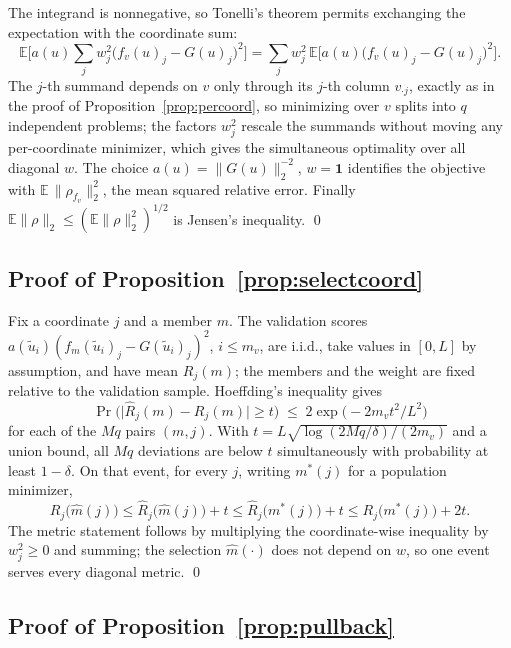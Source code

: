 The integrand is nonnegative, so Tonelli's theorem permits exchanging the
expectation with the coordinate sum:
\[
\mathbb E\Big[a(u)\sum_j w_j^2\big(f_v(u)_j-G(u)_j\big)^2\Big]
=\sum_j w_j^2\,\mathbb E\Big[a(u)\big(f_v(u)_j-G(u)_j\big)^2\Big].
\]
The $j$-th summand depends on $v$ only through its $j$-th column
$v_{\cdot j}$, exactly as in the proof of
Proposition~\ref{prop:percoord}, so minimizing over $v$ splits into $q$
independent problems; the factors $w_j^2$ rescale the summands without
moving any per-coordinate minimizer, which gives the simultaneous optimality
over all diagonal $w$. The choice $a(u)=\|G(u)\|_2^{-2}$, $w=\mathbf 1$
identifies the objective with $\mathbb E\,\|\rho_{f_v}\|_2^2$, the mean
squared relative error. Finally
$\mathbb E\|\rho\|_2\le(\mathbb E\|\rho\|_2^2)^{1/2}$ is Jensen's
inequality. \qed

\subsection{Proof of Proposition~\ref{prop:selectcoord}}
\label{proof:prop:selectcoord}

Fix a coordinate $j$ and a member $m$. The validation scores
$a(\tilde u_i)(f_m(\tilde u_i)_j-G(\tilde u_i)_j)^2$, $i\le m_v$, are i.i.d.,
take values in $[0,L]$ by assumption, and have mean $R_j(m)$; the members and
the weight are fixed relative to the validation sample. Hoeffding's
inequality gives
\[
\Pr\Big(\big|\widehat R_j(m)-R_j(m)\big|\ge t\Big)\;\le\;
2\exp\!\big(-2m_v t^2/L^2\big)
\]
for each of the $Mq$ pairs $(m,j)$. With
$t=L\sqrt{\log(2Mq/\delta)/(2m_v)}$ and a union bound, all $Mq$ deviations
are below $t$ simultaneously with probability at least $1-\delta$. On that
event, for every $j$, writing $m^\ast(j)$ for a population minimizer,
\[
R_j\big(\widehat m(j)\big)\le\widehat R_j\big(\widehat m(j)\big)+t
\le\widehat R_j\big(m^\ast(j)\big)+t\le R_j\big(m^\ast(j)\big)+2t .
\]
The metric statement follows by multiplying the coordinate-wise inequality
by $w_j^2\ge0$ and summing; the selection $\widehat m(\cdot)$ does not
depend on $w$, so one event serves every diagonal metric. \qed

\subsection{Proof of Proposition~\ref{prop:pullback}}
\label{proof:prop:pullback}

